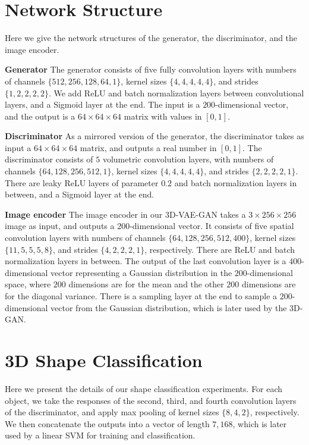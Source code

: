 \documentclass{article}
\newcommand{\model}{3D-GAN\xspace}
\newcommand{\vaemodel}{3D-VAE-GAN\xspace}
\begin{document}
\section{Network Structure}
Here we give the network structures of the generator, the discriminator, and the image encoder. 

{\bf Generator} The generator consists of five fully convolution layers with numbers of channels $\{512,256,128,64,1\}$, kernel sizes $\{4,4,4,4,4\}$, and strides $\{1,2,2,2,2\}$. We add ReLU and batch normalization layers between convolutional layers, and a Sigmoid layer at the end. 
The input is a $200$-dimensional vector, and the output is a $64\times64\times64$ matrix with values in $[0,1]$.     

{\bf Discriminator} As a mirrored version of the generator, the discriminator takes as input a $64\times64\times64$ matrix, and outputs a real number in $[0,1]$. The discriminator consists of $5$ volumetric convolution layers, with numbers of channels $\{64,128,256,512,1\}$, kernel sizes $\{4,4,4,4,4\}$, and strides $\{2,2,2,2,1\}$. There are leaky ReLU layers of parameter $0.2$ and batch normalization layers in between, and a Sigmoid layer at the end. 

{\bf Image encoder} The image encoder in our \vaemodel takes a $3\times256\times256$ image as input, and outputs a $200$-dimensional vector. It consists of five spatial convolution layers with numbers of channels $\{64,128,256,512,400\}$, kernel sizes $\{11,5,5,5,8\}$, and strides $\{4,2,2,2,1\}$, respectively. There are ReLU and batch normalization layers in between. The output of the last convolution layer is a $400$-dimensional vector representing a Gaussian distribution in the $200$-dimensional space, where $200$ dimensions are for the mean and the other $200$ dimensions are for the diagonal variance. There is a sampling layer at the end to sample a $200$-dimensional vector from the Gaussian distribution, which is later used by the \model. 

\section{3D Shape Classification}

Here we present the details of our shape classification experiments. For each object, we take the responses of the second, third, and fourth convolution layers of the discriminator, and apply max pooling of kernel sizes $\{8,4,2\}$, respectively. We then concatenate the outputs into a vector of length $7,168$, which is later used by a linear SVM for training and classification. 
\end{document}
